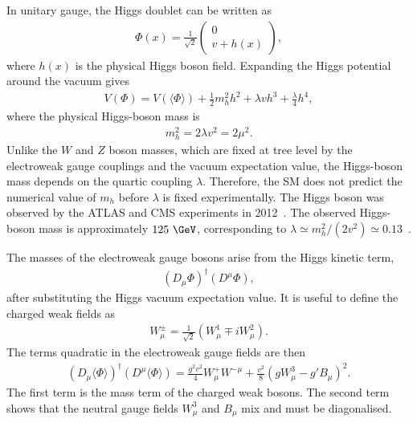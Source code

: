 In unitary gauge, the Higgs doublet can be written as
\begin{align}
    \Phi(x)
    =
    \frac{1}{\sqrt{2}}
    \begin{pmatrix}
        0 \\
        v+h(x)
    \end{pmatrix},
    \label{eq:higgs_unitary_gauge}
\end{align}
where $h(x)$ is the physical Higgs boson field. 
Expanding the Higgs potential around the vacuum gives
\begin{align}
    V(\Phi)
    =
    V(\langle\Phi\rangle)
    +
    \frac{1}{2}m_{h}^{2}h^{2}
    +
    \lambda v h^{3}
    +
    \frac{\lambda}{4}h^{4},
    \label{eq:higgs_potential_expanded}
\end{align}
where the physical Higgs-boson mass is
\begin{align}
    m_{h}^{2}
    =
    2\lambda v^{2}
    =
    2\mu^{2}.
    \label{eq:higgs_boson_mass}
\end{align}
Unlike the $W$ and $Z$ boson masses, which are fixed at tree level by the electroweak gauge couplings and the vacuum expectation value, the Higgs-boson mass depends on the quartic coupling $\lambda$. 
Therefore, the SM does not predict the numerical value of $m_{h}$ before $\lambda$ is fixed experimentally. 
The Higgs boson was observed by the ATLAS and CMS experiments in 2012~\cite{ATLAS2012Higgs,CMS2012Higgs}. 
The observed Higgs-boson mass is approximately $125~\GeV$, corresponding to $\lambda\simeq m_{h}^{2}/(2v^{2})\simeq0.13$~\cite{ATLASCMSHiggsMass2015}.

The masses of the electroweak gauge bosons arise from the Higgs kinetic term,
\begin{align}
    (D_{\mu}\Phi)^{\dagger}(D^{\mu}\Phi),
\end{align}
after substituting the Higgs vacuum expectation value. 
It is useful to define the charged weak fields as
\begin{align}
    W_{\mu}^{\pm}
    =
    \frac{1}{\sqrt{2}}
    \left(
        W_{\mu}^{1}
        \mp
        iW_{\mu}^{2}
    \right).
    \label{eq:charged_weak_bosons}
\end{align}
The terms quadratic in the electroweak gauge fields are then
\begin{align}
    (D_{\mu}\langle\Phi\rangle)^{\dagger}
    (D^{\mu}\langle\Phi\rangle)
    =
    \frac{g^{2}v^{2}}{4}W_{\mu}^{+}W^{-\mu}
    +
    \frac{v^{2}}{8}
    \left(
        gW_{\mu}^{3}
        -
        g'B_{\mu}
    \right)^{2}.
    \label{eq:ew_gauge_boson_mass_terms}
\end{align}
The first term is the mass term of the charged weak bosons. 
The second term shows that the neutral gauge fields $W_{\mu}^{3}$ and $B_{\mu}$ mix and must be diagonalised.

